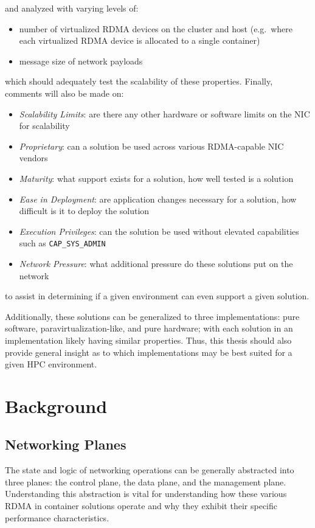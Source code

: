 \documentclass[12pt,titlepage]{article}
\begin{document}
\noindent
and analyzed with varying levels of:
\begin{itemize}[nolistsep]
	\item number of virtualized RDMA devices on the cluster and host (e.g.\ where each virtualized RDMA device is allocated to a single container)
	\item message size of network payloads
\end{itemize}
which should adequately test the scalability of these properties.
Finally, comments will also be made on:
\begin{itemize}[nolistsep]
	\item \textit{Scalability Limits}: are there any other hardware or software limits on the NIC for scalability
	\item \textit{Proprietary}: can a solution be used across various RDMA-capable NIC vendors
	\item \textit{Maturity}: what support exists for a solution, how well tested is a solution
	\item \textit{Ease in Deployment}: are application changes necessary for a solution, how difficult is it to deploy the solution
	\item \textit{Execution Privileges}: can the solution be used without elevated capabilities such as \texttt{CAP\_SYS\_ADMIN}
	\item \textit{Network Pressure}: what additional pressure do these solutions put on the network
\end{itemize}
to assist in determining if a given environment can even support a given solution.

Additionally, these solutions can be generalized to three implementations: pure software, paravirtualization-like, and pure hardware;
with each solution in an implementation likely having similar properties.
Thus, this thesis should also provide general insight as to which implementations may be best suited for a given HPC environment.


\section{Background}
\subsection{Networking Planes}\label{subsec:Networking Planes}
The state and logic of networking operations can be generally abstracted into three planes: the control plane, the data plane, and the management plane.
Understanding this abstraction is vital for understanding how these various RDMA in container solutions operate and why they exhibit their specific performance characteristics.
\end{document}
